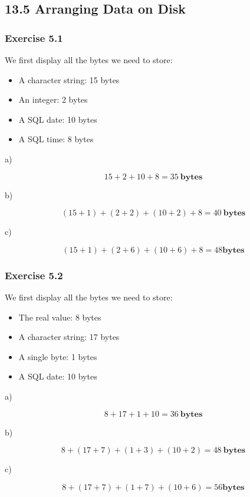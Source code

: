 \documentclass[../../main.tex]{subfiles}
\begin{document}
\subsection{13.5 Arranging Data on Disk}

\hypertarget{Exercise13.5.1}{\subsubsection*{Exercise 5.1}}

We first display all the bytes we need to store:

\begin{itemize}
  \item A character string: 15 bytes
  \item An integer: 2 bytes
  \item A SQL date: 10 bytes
  \item A SQL time: 8 bytes
\end{itemize}

a)

$$
15 + 2 + 10 + 8 = 35 \ \mathbf{bytes}
$$

b)

$$
(15 + 1) + (2 + 2) + (10 + 2) + 8 = 40 \ \mathbf{bytes}
$$

c)

$$
(15 + 1) + (2 + 6) + (10 + 6) + 8 = 48 \mathbf{bytes}
$$

\hypertarget{Exercise13.5.2}{\subsubsection*{Exercise 5.2}}

We first display all the bytes we need to store:

\begin{itemize}
  \item The real value: 8 bytes
  \item A character string:  17 bytes
  \item A single byte: 1 bytes
  \item A SQL date: 10 bytes
\end{itemize}

a)

$$
8 + 17 + 1 + 10 = 36 \ \mathbf{bytes}
$$

b)

$$
8 + (17 + 7) + (1 + 3) + (10 + 2) = 48 \ \mathbf{bytes}
$$

c)

$$
8 + (17 + 7) + (1 + 7) + (10 + 6) = 56 \mathbf{bytes}
$$
\end{document}
